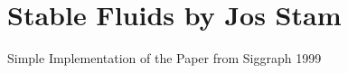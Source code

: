 

\chapter{ Stable Fluids by Jos Stam } \label{sec:StableFluids}

Simple Implementation of the Paper from Siggraph 1999

